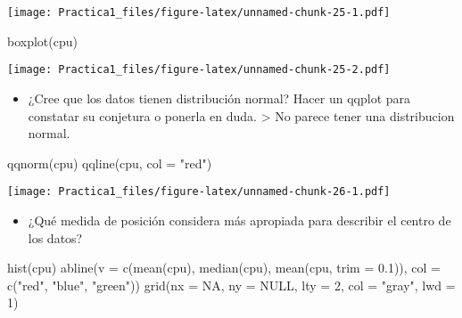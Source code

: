 \documentclass[
]{article}
\newenvironment{Shaded}{\begin{snugshade}}{\end{snugshade}}
\newcommand{\AttributeTok}[1]{\textcolor[rgb]{0.77,0.63,0.00}{#1}}
\newcommand{\ConstantTok}[1]{\textcolor[rgb]{0.00,0.00,0.00}{#1}}
\newcommand{\DecValTok}[1]{\textcolor[rgb]{0.00,0.00,0.81}{#1}}
\newcommand{\FloatTok}[1]{\textcolor[rgb]{0.00,0.00,0.81}{#1}}
\newcommand{\FunctionTok}[1]{\textcolor[rgb]{0.00,0.00,0.00}{#1}}
\newcommand{\NormalTok}[1]{#1}
\newcommand{\StringTok}[1]{\textcolor[rgb]{0.31,0.60,0.02}{#1}}
\providecommand{\tightlist}{%
  \setlength{\itemsep}{0pt}\setlength{\parskip}{0pt}}
\begin{document}
\texttt{[image: Practica1\_files/figure-latex/unnamed-chunk-25-1.pdf]}

\begin{Shaded}
\begin{Highlighting}[]
\FunctionTok{boxplot}\NormalTok{(cpu)}
\end{Highlighting}
\end{Shaded}

\texttt{[image: Practica1\_files/figure-latex/unnamed-chunk-25-2.pdf]}

\begin{itemize}
\tightlist
\item
  ¿Cree que los datos tienen distribución normal? Hacer un qqplot para
  constatar su conjetura o ponerla en duda. \textgreater{} No parece
  tener una distribucion normal.
\end{itemize}

\begin{Shaded}
\begin{Highlighting}[]
\FunctionTok{qqnorm}\NormalTok{(cpu)}
\FunctionTok{qqline}\NormalTok{(cpu, }\AttributeTok{col =} \StringTok{"red"}\NormalTok{)}
\end{Highlighting}
\end{Shaded}

\texttt{[image: Practica1\_files/figure-latex/unnamed-chunk-26-1.pdf]}

\begin{itemize}
\tightlist
\item
  ¿Qué medida de posición considera más apropiada para describir el
  centro de los datos?
\end{itemize}

\begin{Shaded}
\begin{Highlighting}[]
\FunctionTok{hist}\NormalTok{(cpu)}
\FunctionTok{abline}\NormalTok{(}\AttributeTok{v =} \FunctionTok{c}\NormalTok{(}\FunctionTok{mean}\NormalTok{(cpu), }\FunctionTok{median}\NormalTok{(cpu), }\FunctionTok{mean}\NormalTok{(cpu, }\AttributeTok{trim =} \FloatTok{0.1}\NormalTok{)), }\AttributeTok{col =} \FunctionTok{c}\NormalTok{(}\StringTok{"red"}\NormalTok{, }\StringTok{"blue"}\NormalTok{, }\StringTok{"green"}\NormalTok{))}
\FunctionTok{grid}\NormalTok{(}\AttributeTok{nx =} \ConstantTok{NA}\NormalTok{, }\AttributeTok{ny =} \ConstantTok{NULL}\NormalTok{, }\AttributeTok{lty =} \DecValTok{2}\NormalTok{, }\AttributeTok{col =} \StringTok{"gray"}\NormalTok{, }\AttributeTok{lwd =} \DecValTok{1}\NormalTok{)}
\end{Highlighting}
\end{Shaded}
\end{document}

